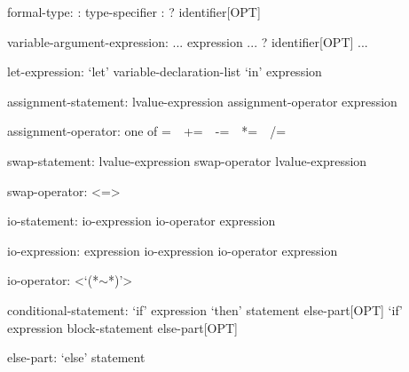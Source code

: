 \begin{syntax}
formal-type:
  : type-specifier
  : ? identifier[OPT]
\end{syntax}

\begin{syntax}
variable-argument-expression:
  ... expression
  ... ? identifier[OPT]
  ...
\end{syntax}

\begin{syntax}
let-expression:
  `let' variable-declaration-list `in' expression
\end{syntax}

\begin{syntax}
assignment-statement:
  lvalue-expression assignment-operator expression
\end{syntax}

\begin{syntax}
assignment-operator: one of
   = $ $ $ $ += $ $ $ $ -= $ $ $ $ *= $ $ $ $ /= $ $ $ $ %
\end{syntax}

\begin{syntax}
swap-statement:
  lvalue-expression swap-operator lvalue-expression
\end{syntax}

\begin{syntax}
swap-operator:
  <=>
\end{syntax}

\begin{syntax}
io-statement:
  io-expression io-operator expression
\end{syntax}

\begin{syntax}
io-expression:
  expression
  io-expression io-operator expression
\end{syntax}

\begin{syntax}
io-operator:
  <`(*$\sim$*)'>
\end{syntax}

\begin{syntax}
conditional-statement:
  `if' expression `then' statement else-part[OPT]
  `if' expression block-statement else-part[OPT]
\end{syntax}

\begin{syntax}
else-part:
  `else' statement
\end{syntax}

